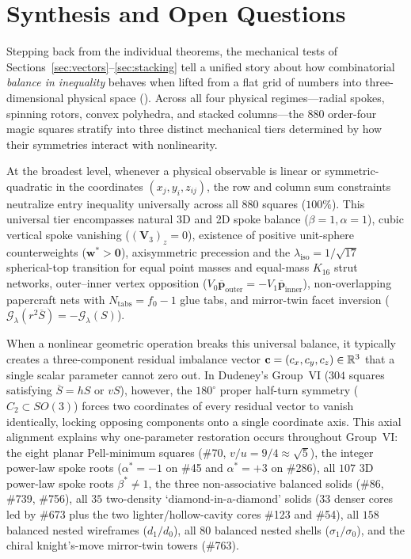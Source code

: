 \section{Synthesis and Open Questions}
\label{sec:discussion}

Stepping back from the individual theorems, the mechanical tests of Sections~\ref{sec:vectors}--\ref{sec:stacking} tell a unified story about how combinatorial \emph{balance in inequality} behaves when lifted from a flat grid of numbers into three-dimensional physical space (). Across all four physical regimes—radial spokes, spinning rotors, convex polyhedra, and stacked columns—the $880$ order-four magic squares stratify into three distinct mechanical tiers determined by how their symmetries interact with nonlinearity.

At the broadest level, whenever a physical observable is linear or symmetric-quadratic in the coordinates $(x_j,y_i,z_{ij})$, the row and column sum constraints neutralize entry inequality universally across all $880$ squares ($100\%$). This universal tier encompasses natural 3D and 2D spoke balance ($\beta=1,\alpha=1$), cubic vertical spoke vanishing ($(\mathbf V_3)_z=0$), existence of positive unit-sphere counterweights ($\mathbf w^*>\mathbf 0$), axisymmetric precession and the $\lambda_{\mathrm{iso}}=1/\sqrt{17}$ spherical-top transition for equal point masses and equal-mass $K_{16}$ strut networks, outer--inner vertex opposition ($V_0\overline{\mathbf p}_{\mathrm{outer}}=-V_1\overline{\mathbf p}_{\mathrm{inner}}$), non-overlapping papercraft nets with $N_{\mathrm{tabs}}=f_0-1$ glue tabs, and mirror-twin facet inversion ($\mathcal G_\lambda(r^2\overline S)=-\mathcal G_\lambda(S)$).

When a nonlinear geometric operation breaks this universal balance, it typically creates a three-component residual imbalance vector $\mathbf c=(c_x,c_y,c_z)\in\mathbb{R}^3$ that a single scalar parameter cannot zero out. In Dudeney's Group~VI ($304$ squares satisfying $\overline S=hS$ or $vS$), however, the $180^\circ$ proper half-turn symmetry ($C_2\subset SO(3)$) forces two coordinates of every residual vector to vanish identically, locking opposing components onto a single coordinate axis. This axial alignment explains why one-parameter restoration occurs throughout Group~VI: the eight planar Pell-minimum squares (\#70, $v/u=9/4\approx\sqrt{5}$), the integer power-law spoke roots ($\alpha^*=-1$ on \#45 and $\alpha^*=+3$ on \#286), all $107$ 3D power-law spoke roots $\beta^*\ne1$, the three non-associative balanced solids (\#86, \#739, \#756), all $35$ two-density `diamond-in-a-diamond' solids ($33$ denser cores led by \#673 plus the two lighter/hollow-cavity cores \#123 and \#54), all $158$ balanced nested wireframes ($d_1/d_0$), all $80$ balanced nested shells ($\sigma_1/\sigma_0$), and the chiral knight's-move mirror-twin towers (\#763).

